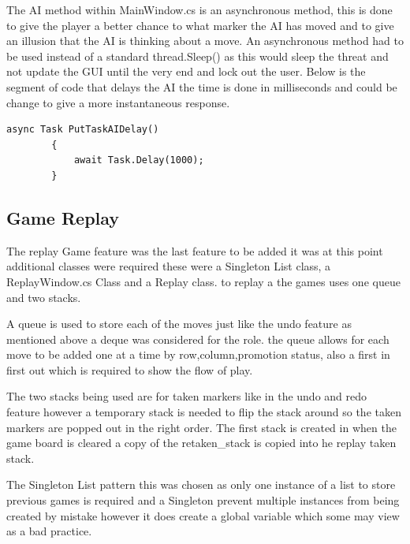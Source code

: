 \documentclass[10pt, a4paper]{article}
\begin{document}
The AI method within MainWindow.cs is an asynchronous method, this is done to give the player a better chance to what marker the AI has moved and to give an illusion that the AI is thinking about a move. An asynchronous method had to be used instead of a standard thread.Sleep() as this would sleep the threat and not update the GUI until the very end and lock out the user.
Below is the segment of code that delays the AI the time is done in milliseconds and could be change to give a more instantaneous response.
\begin{lstlisting}[caption =code to delay the AI for 1 second]
 async Task PutTaskAIDelay()
        {
            await Task.Delay(1000);
        }
\end{lstlisting}
	
	\subsection{Game Replay}
The replay Game feature was the last feature to be added it was at this point additional classes were required these were a Singleton List class, a ReplayWindow.cs Class and a Replay class. to replay a  the games uses one queue and two stacks. 

A queue is used to store each of the moves just like the undo feature as mentioned above a deque was considered for the role. the queue allows for each move to be added one at a time by row,column,promotion status, also a first in first out which is required to show the flow of play.  

The two stacks being used are for taken markers like in the undo and redo feature however a temporary stack is needed to flip the stack around so the taken markers are popped out in the right order. The first stack is created in when the game board is cleared a copy of the retaken\_stack is copied into he replay taken stack.

The Singleton List pattern this was chosen as only one instance of a list to store previous games is required and a Singleton prevent multiple instances from being created by mistake however it does create a global variable which some may view as a bad practice.
\end{document}
